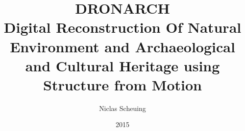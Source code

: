 \documentclass[a4paper]{report}
\begin{document}
	
	\title{\huge{DRONARCH} \\ \vspace*{1cm}\normalsize{Digital Reconstruction Of Natural Environment and Archaeological and Cultural Heritage using Structure from Motion}}
	
	\author{Niclas Scheuing}
	\date{2015}
	
	 \setcounter{page}{1}
	\maketitle
	\tableofcontents
	\clearpage
	 \setcounter{page}{1}
	
	
	
	
	
	
	
	
	\begin{appendix}
				
	\end{appendix}
	
	\listoffigures
	
%		
%	
	
	\nocite{*}
	
	

	
\end{document}
